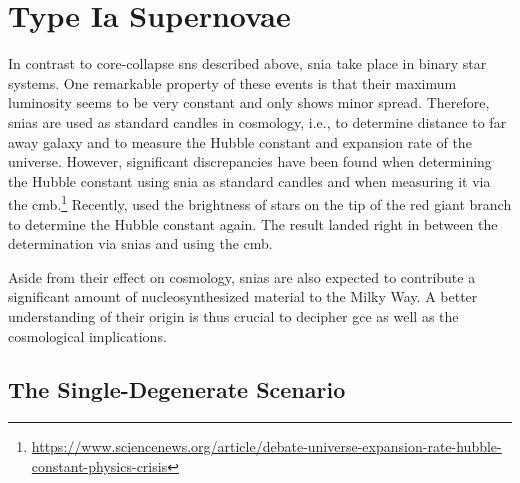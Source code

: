 \section{Type Ia Supernovae}\label{sec:massive_stars:snia}

In contrast to core-collapse \acp{sn} described above, \ac{snia} take place in binary star systems. One remarkable property of these events is that their maximum luminosity seems to be very constant and only shows minor spread. Therefore, \acp{snia} are used as standard candles in cosmology, i.e., to determine distance to far away galaxy and to measure the Hubble constant and expansion rate of the universe. However, significant discrepancies have been found when determining the Hubble constant using \ac{snia} as standard candles and when measuring it via the \ac{cmb}.\footnote{\url{https://www.sciencenews.org/article/debate-universe-expansion-rate-hubble-constant-physics-crisis}} Recently, \citet{freedman19} used the brightness of stars on the tip of the red giant branch to determine the Hubble constant again. The result landed right in between the determination via \acp{snia} and using the \ac{cmb}. 

Aside from their effect on cosmology, \acp{snia} are also expected to contribute a significant amount of nucleosynthesized material to the Milky Way. A better understanding of their origin is thus crucial to decipher \ac{gce} as well as the cosmological implications.


\subsection{The Single-Degenerate Scenario}

